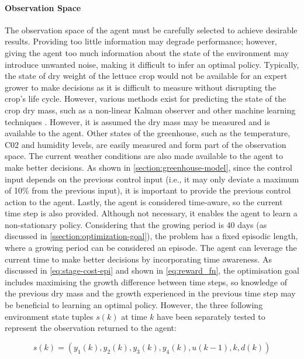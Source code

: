 \paragraph{Observation Space}
The observation space of the agent must be carefully selected to achieve desirable results. Providing too little information may degrade performance; however, giving the agent too much information about the state of the environment may introduce unwanted noise, making it difficult to infer an optimal policy. Typically, the state of dry weight of the lettuce crop would not be available for an expert grower to make decisions as it is difficult to measure without disrupting the crop’s life cycle. However, various methods exist for predicting the state of the crop dry mass, such as a non-linear Kalman observer and other machine learning techniques \cite{gongDeepLearningBased2021}. However, it is assumed the dry mass may be measured and is available to the agent. Other states of the greenhouse, such as the temperature, C02 and humidity levels, are easily measured and form part of the observation space. The current weather conditions are also made available to the agent to make better decisions. As shown in \autoref{section:greenhouse-model}, since the control input depends on the previous control input (i.e., it may only deviate a maximum of 10\% from the previous input), it is important to provide the previous control action to the agent. Lastly, the agent is considered time-aware, so the current time step is also provided. Although not necessary, it enables the agent to learn a non-stationary policy. Considering that the growing period is 40 days (as discussed in \autoref{ssection:optimization-goal}), the problem has a fixed episodic length, where a growing period can be considered an episode. The agent can leverage the current time to make better decisions by incorporating time awareness. As discussed in \autoref{eq:stage-cost-epi} and shown in \autoref{eq:reward_fn}, the optimisation goal includes maximising the growth difference between time steps, so knowledge of the previous dry mass and the growth experienced in the previous time step may be beneficial to learning an optimal policy. However, the three following environment state tuples $s(k)$ at time $k$ have been separately tested to represent the observation returned to the agent:

\begin{equation}\label{eq:obs-tuple-1}
    s(k) = (y_1(k),y_2(k),y_3(k),y_4(k), u(k-1), k, d(k))
\end{equation}

